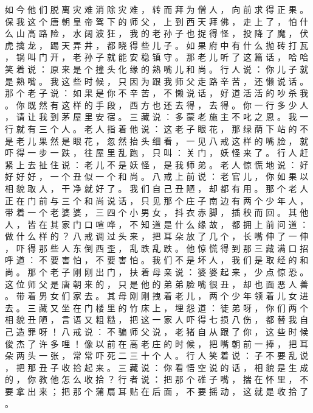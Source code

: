 {如 今 他 们 脱 离 灾 难 消 除 灾 难 ， 转 而 拜 为 僧 人 ， 向 前 求 得 正 果 。
保 我 这 个 唐 朝 皇 帝 驾 下 的 师 父 ， 上 到 西 天 拜 佛 ， 走 上 了 ， 怕 什 么 山 高 路 险 ， 水 阔 波 狂 ， 我 的 老 孙 子 也 捉 得 怪 ， 投 降 了 魔 ， 伏 虎 擒 龙 ， 踢 天 弄 井 ， 都 晓 得 些 儿 子 。
如 果 府 中 有 什 么 抛 砖 打 瓦 ， 锅 叫 门 开 ， 老 孙 子 就 能 安 稳 镇 守 。
那 老 儿 听 了 这 篇 话 ， 哈 哈 笑 着 说 ： 原 来 是 个 撞 头 化 缘 的 熟 嘴 儿 和 尚 。
行 人 说 ： 你 儿 子 就 是 熟 嘴 。
我 这 些 时 候 ， 只 因 为 跟 我 师 父 走 路 辛 苦 ， 还 懒 说 话 。
那 个 老 子 说 ： 如 果 是 你 不 辛 苦 ， 不 懒 说 话 ， 好 道 活 活 的 吵 杀 我 。
你 既 然 有 这 样 的 手 段 ， 西 方 也 还 去 得 ， 去 得 。
你 一 行 多 少 人 ， 请 让 我 到 茅 屋 里 安 宿 。
三 藏 说 ： 多 蒙 老 施 主 不 叱 之 恩 。
我 一 行 就 有 三 个 人 。
老 人 指 着 他 说 ： 这 老 子 眼 花 ， 那 绿 荫 下 站 的 不 是 老 儿 果 然 是 眼 花 ， 忽 然 抬 头 细 看 ， 一 见 八 戒 这 样 的 嘴 脸 ， 就 吓 得 一 步 一 跌 ， 往 屋 里 乱 跑 ， 只 叫 ： 关 门 ， 妖 怪 来 了 。 行 人 赶 紧 上 去 扯 住 说 ： 老 儿 不 是 妖 怪 ， 是 我 师 弟 。
老 人 惊 慌 地 说 ： 好 好 好 好 ， 一 个 丑 似 一 个 和 尚 。
八 戒 上 前 说 ： 老 官 儿 ， 你 如 果 以 相 貌 取 人 ， 干 净 就 好 了 。
我 们 自 己 丑 陋 ， 却 都 有 用 。
那 个 老 人 正 在 门 前 与 三 个 和 尚 说 话 ， 只 见 那 个 庄 子 南 边 有 两 个 少 年 人 ， 带 着 一 个 老 婆 婆 ， 三 四 个 小 男 女 ， 抖 衣 赤 脚 ， 插 秧 而 回 。
其 他 人 ， 皆 在 其 家 门 口 喧 哗 ， 不 知 道 是 什 么 缘 故 ， 都 拥 上 前 问 道 ： 做 什 么 样 的 ？ 八 戒 调 过 头 来 ， 把 耳 朵 放 了 几 个 ， 长 嘴 伸 了 一 伸 ， 吓 得 那 些 人 东 倒 西 歪 ， 乱 跌 乱 跌 。
他 惊 慌 得 到 那 三 藏 满 口 招 呼 道 ： 不 要 害 怕 ， 不 要 害 怕 。
我 们 不 是 坏 人 ， 我 们 是 取 经 的 和 尚 。
那 个 老 子 刚 刚 出 门 ， 扶 着 母 亲 说 ： 婆 婆 起 来 ， 少 点 惊 恐 。
这 位 师 父 是 唐 朝 来 的 ， 只 是 他 的 弟 弟 脸 嘴 很 丑 ， 却 也 面 恶 人 善 。
带 着 男 女 们 家 去 。
其 母 刚 刚 拽 着 老 儿 ， 两 个 少 年 领 着 儿 女 进 去 。
三 藏 又 坐 在 门 楼 里 的 竹 床 上 ， 埋 怨 道 ： 徒 弟 呀 ， 你 们 两 个 相 貌 丑 陋 ， 言 语 又 粗 糙 ， 把 这 一 家 人 吓 得 七 损 八 伤 ， 都 替 我 自 己 造 罪 呀 ！
八 戒 说 ： 不 骗 师 父 说 ， 老 猪 自 从 跟 了 你 ， 这 些 时 候 俊 杰 了 许 多 哩 ！
像 以 前 在 高 老 庄 的 时 候 ， 把 嘴 朝 前 一 捧 ， 把 耳 朵 两 头 一 张 ， 常 常 吓 死 二 三 十 个 人 。
行 人 笑 着 说 ： 子 不 要 乱 说 ， 把 那 丑 子 收 拾 起 来 。
三 藏 说 ： 你 看 悟 空 说 的 话 ， 相 貌 是 生 成 的 ， 你 教 他 怎 么 收 拾 ？ 行 者 说 ： 把 那 个 碓 子 嘴 ， 揣 在 怀 里 ， 不 要 拿 出 来 ； 把 那 个 蒲 扇 耳 贴 在 后 面 ， 不 要 摇 动 ， 这 就 是 收 拾 了 。
}

